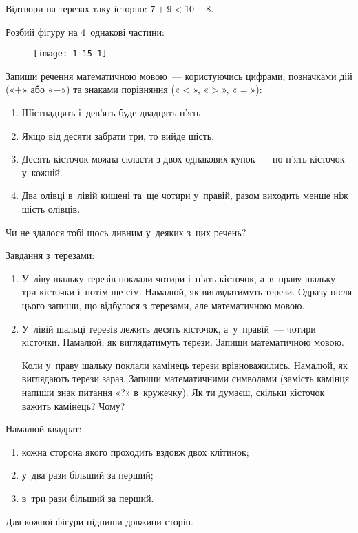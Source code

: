 \problem
Відтвори на терезах таку історію: $7+9 < 10+8$.


\problem
Розбий фігуру на 4~однакові частини:

\begin{figure}[h]
    \centering
    \texttt{[image: 1-15-1]}
\end{figure}


\problem
Запиши речення математичною мовою~--- користуючись цифрами,
позначками дій («$+$» або «$-$») та знаками порівняння («$<$», «$>$», «$=$»):
\begin{enumerate}
    \item Шістнадцять і~дев'ять буде двадцять п'ять.
    \item Якщо від десяти забрати три, то вийде шість.
    \item Десять кісточок можна скласти з двох однакових купок~---
    по п'ять кісточок у~кожній.
    \item Два олівці в~лівій кишені та~ще чотири у~правій,
    разом виходить менше ніж шість олівців.
\end{enumerate}
Чи не здалося тобі щось дивним у~деяких з~цих речень?

\problem
Завдання з~терезами:
\begin{enumerate}
    \item У~ліву шальку терезів поклали чотири і~п'ять кісточок,
    а~в~праву шальку~--- три кісточки і~потім ще сім.
    Намалюй, як виглядатимуть терези.
    Одразу після цього запиши, що відбулося з~терезами,
    але математичною мовою.
    \item У~лівій шальці терезів лежить десять кісточок,
    а~у~правій~--- чотири кісточки.
    Намалюй, як виглядатимуть терези. Запиши математичною мовою.

    Коли у~праву шальку поклали камінець терези врівноважились.
    Намалюй, як виглядають терези зараз.
    Запиши математичними символами
    (замість камінця напиши знак питання «?» в~кружечку).
    Як ти думаєш, скільки кісточок важить камінець? Чому?
\end{enumerate}


\problem
Намалюй квадрат:
\begin{enumerate}
    \item кожна сторона якого проходить вздовж двох клітинок;
    \item у~два рази більший за перший;
    \item в~три рази більший за перший.
\end{enumerate}
Для кожної фігури підпиши довжини сторін.



